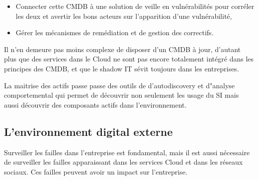 \begin{itemize}
  \item Connecter cette CMDB à une solution de veille en vulnérabilités pour corréler les deux et avertir les bons acteurs sur l'apparition d'une vulnérabilité,
\item Gérer les mécanismes de remédiation et de gestion des correctifs.
\end{itemize}

Il n'en demeure pas moins complexe de disposer d'un CMDB à jour, d'autant plus que des services dans le Cloud ne sont pas encore totalement intégré dans les principes des CMDB, et que le shadow IT  sévit toujours dans les entreprises.

La maitrise des actifs passe passe des outils de d'autodiscovery et d"analyse comportemental qui permet de découvrir non seulement les usage du SI mais aussi découvrir des composants actifs dans l'environnement.


%
\subsection{L’environnement digital externe}

Surveiller les failles dans l'entreprise est fondamental, mais il est aussi nécessaire de surveiller les failles apparaissant dans les services Cloud et dans les réseaux sociaux. Ces failles peuvent avoir un impact sur l'entreprise.



